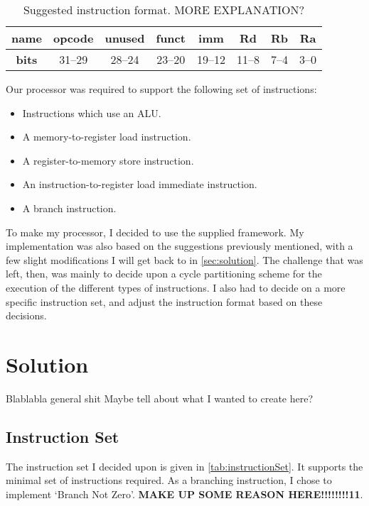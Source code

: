 \documentclass[11pt]{article}
\begin{document}
\begin{table}[htbp]
  \centering
  \begin{tabular}{|c|c|c|c|c|c|c|c|}
    \hline
    {\bf name} & opcode & unused & funct & imm & Rd & Rb & Ra \\ \hline
    {\bf bits} & 31--29 & 28--24 & 23--20 & 19--12 & 11--8 & 7--4 & 3--0 \\ \hline
  \end{tabular}
  \caption{Suggested instruction format. MORE EXPLANATION?}
  \label{tab:suggestedFormat}
\end{table}


Our processor was required to support the following set of instructions:
\begin{itemize}
\item Instructions which use an ALU.
\item A memory-to-register load instruction.
\item A register-to-memory store instruction.
\item An instruction-to-register load immediate instruction.
\item A branch instruction.
\end{itemize}

To make my processor, I decided to use the supplied framework. My
implementation was also based on the suggestions previously mentioned,
with a few slight modifications I will get back to in
\autoref{sec:solution}. The challenge that was left, then, was mainly
to decide upon a cycle partitioning scheme for the execution of the
different types of instructions. I also had to decide on a more
specific instruction set, and adjust the instruction format based on
these decisions.

\section{Solution}
\label{sec:solution}
Blablabla general shit
Maybe tell about what I wanted to create here?

\subsection{Instruction Set}
\label{subsec:instructionSet}
The instruction set I decided upon is given in
\autoref{tab:instructionSet}. It supports the minimal set of
instructions required. As a branching instruction, I chose to
implement `Branch Not Zero'. {\bf MAKE UP SOME REASON
  HERE!!!!!!!!11}. 
\end{document}
